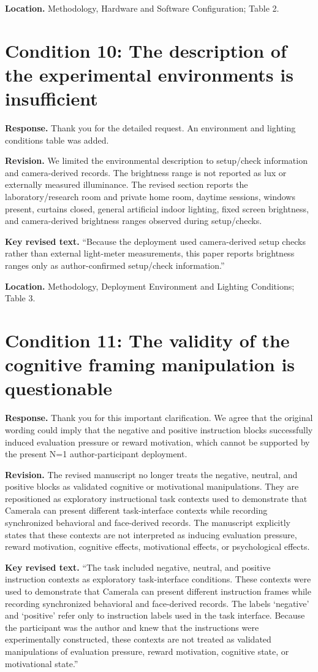 \documentclass[11pt]{article}
\newcommand{\condition}[2]{\section*{Condition #1: #2}}
\begin{document}
\textbf{Location.}
Methodology, Hardware and Software Configuration; Table 2.

\condition{10}{The description of the experimental environments is insufficient}
\textbf{Response.}
Thank you for the detailed request.
An environment and lighting conditions table was added.

\textbf{Revision.}
We limited the environmental description to setup/check information and camera-derived records.
The brightness range is not reported as lux or externally measured illuminance.
The revised section reports the laboratory/research room and private home room, daytime sessions, windows present, curtains closed, general artificial indoor lighting, fixed screen brightness, and camera-derived brightness ranges observed during setup/checks.

\textbf{Key revised text.}
``Because the deployment used camera-derived setup checks rather than external light-meter measurements, this paper reports brightness ranges only as author-confirmed setup/check information.''

\textbf{Location.}
Methodology, Deployment Environment and Lighting Conditions; Table 3.

\condition{11}{The validity of the cognitive framing manipulation is questionable}
\textbf{Response.}
Thank you for this important clarification.
We agree that the original wording could imply that the negative and positive instruction blocks successfully induced evaluation pressure or reward motivation, which cannot be supported by the present N=1 author-participant deployment.

\textbf{Revision.}
The revised manuscript no longer treats the negative, neutral, and positive blocks as validated cognitive or motivational manipulations.
They are repositioned as exploratory instructional task contexts used to demonstrate that Camerala can present different task-interface contexts while recording synchronized behavioral and face-derived records.
The manuscript explicitly states that these contexts are not interpreted as inducing evaluation pressure, reward motivation, cognitive effects, motivational effects, or psychological effects.

\textbf{Key revised text.}
``The task included negative, neutral, and positive instruction contexts as exploratory task-interface conditions.
These contexts were used to demonstrate that Camerala can present different instruction frames while recording synchronized behavioral and face-derived records.
The labels `negative' and `positive' refer only to instruction labels used in the task interface.
Because the participant was the author and knew that the instructions were experimentally constructed, these contexts are not treated as validated manipulations of evaluation pressure, reward motivation, cognitive state, or motivational state.''
\end{document}
